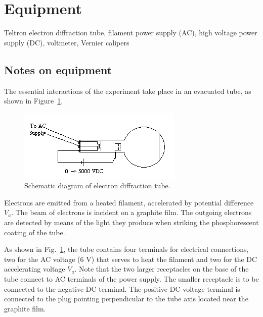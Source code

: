 \section{Equipment}
Teltron electron diffraction tube, filament power supply (AC), high voltage power supply (DC), voltmeter, Vernier calipers

\subsection{Notes on equipment}

The essential interactions of the experiment take place in an evacuated
tube, as shown in Figure~\ref{fig:schematic}. 
\begin{figure}
\begin{centering}
\includegraphics[width=3.0929in,height=1.3543in]{../images/ediffraction-img1.png}
\caption{Schematic diagram of electron diffraction tube.}
\label{fig:schematic}
\end{centering}
\end{figure}
Electrons are emitted from a heated filament,
accelerated by potential difference $V_a$.  The beam of
electrons is incident on a graphite film.  The outgoing electrons are
detected by means of the light they produce when striking the
phosphorescent coating of the tube. 

As shown in Fig.~\ref{fig:schematic}, the tube contains four terminals for electrical
connections, two for the AC voltage (6 V) that serves to heat the
filament and two for the DC accelerating voltage $V_a$.
 Note that the two larger receptacles on the base of the tube connect
to AC terminals of the power supply.  The smaller receptacle is to be
connected to the negative DC terminal.  The positive DC voltage
terminal is connected to the plug pointing perpendicular to the tube
axis located near the graphite film.

